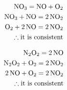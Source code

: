 \documentclass[12pt]{article}
\begin{document}
\begin{enumerate}
    \begin{equation}
      \begin{split}
        \ce{NO3} = \ce{NO + O2}\\
        \ce{NO3 + NO} = \ce{2NO2}\\
        \ce{O2 + 2NO} = \ce{2NO2}\\
        \therefore \text{it is consistent}
      \end{split}
      \label{3}
    \end{equation}

    \begin{equation}
      \begin{split}
        \ce{N2O2} = \ce{2NO}\\
        \ce{N2O2 + O2} = \ce{2NO2}\\
        \ce{2NO + O2} = \ce{2NO2}\\
        \therefore \text{it is consistent}
      \end{split}
      \label{4}
    \end{equation}

\end{enumerate}
\end{document}
